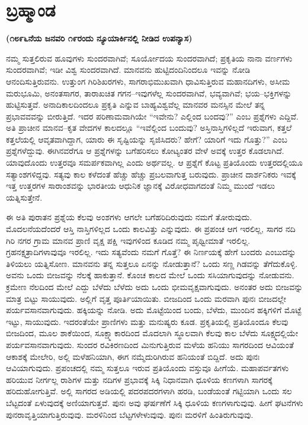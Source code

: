 \chapter{ಬ್ರಹ್ಮಾಂಡ}%

\centerline{\textbf{(೧೮೯೬ನೆಯ ಜನವರಿ ೧೯ರಂದು ನ್ಯೂಯಾರ್ಕಿನಲ್ಲಿ ನೀಡಿದ ಉಪನ್ಯಾಸ)}}

ನಮ್ಮ ಸುತ್ತಲಿರುವ ಹೂವುಗಳು ಸುಂದರವಾಗಿವೆ; ಸೂರ್ಯೋದಯ ಸುಂದರವಾಗಿದೆ; ಪ್ರಕೃತಿಯ ನಾನಾ ವರ್ಣಗಳು ಸುಂದರವಾಗಿವೆ; ಇಡೀ ವಿಶ್ವ ಸುಂದರವಾಗಿದೆ. ಮಾನವನು ಹುಟ್ಟಿದಂದಿನಿಂದಲೂ ಇವನ್ನು ನೋಡಿ ಆನಂದಿಸುತ್ತಿರುವನು. ಉತ್ತುಂಗ ಗಿರಿಶಿಖರಗಳು, ಸಾಗರಾಭಿಮುಖವಾಗಿ ಧಾವಿಸುತ್ತಿರುವ ಮಹಾನದಿಗಳು, ಅಸೀಮ ಮರುಭೂಮಿ, ಅನಂತಸಾಗರ, ತಾರಾಖಚಿತ ಗಗನ–ಇವುಗಳೆಲ್ಲ ಸುಂದರವಾಗಿವೆ, ಭವ್ಯವಾಗಿವೆ; ಭಯ–ಭಕ್ತಿಗಳನ್ನು ಹುಟ್ಟಿಸುತ್ತವೆ. ಅನಾದಿಕಾಲದಿಂದಲೂ ಪ್ರಕೃತಿ ಎನ್ನುವ ಬಾಹ್ಯವಿಶ್ವವೆಲ್ಲ ಮಾನವರ ಮನಸ್ಸಿನ ಮೇಲೆ ತನ್ನ ಪ್ರಭಾವವವನ್ನು ಬೀರುತ್ತಿದೆ. ಇದರ ಪರಿಣಾಮವಾಗಿಯೇ “ಇವೇನು? ಎಲ್ಲಿಂದ ಬಂದವು?” ಎಂಬ ಪ್ರಶ್ನೆಗಳು ಎದ್ದಿವೆ. ಅತಿ ಪ್ರಾಚೀನ ಮಾನವ–ಕೃತ ವೇದಗಳ ಕಾಲದಲ್ಲೂ “ಇವೆಲ್ಲಿಂದ ಬಂದುವು? ಅಸ್ತಿನಾಸ್ತಿಗಳಿಲ್ಲದೆ ಇರುವಾಗ, ಕತ್ತಲೆ ಕತ್ತಲೆಯಲ್ಲಿ ಆವೃತವಾಗಿದ್ದಾಗ, ಯಾರು ಈ ಸೃಷ್ಟಿಯನ್ನು ಸೃಜಿಸಿದರು? ಹೇಗೆ? ಯಾರಿಗೆ ಇದು ಗೊತ್ತು?” ಎಂಬ ಪ್ರಶ್ನೆಗಳೆದ್ದುವು. ಈಗಿನವರೆಗೂ ಆ ಪ್ರಶ್ನೆಗಳನ್ನು ಬಗೆಹರಿಸಲು ಕೋಟ್ಯಂತರ ವೇಳೆ ಅವಕ್ಕೆ ಉತ್ತರ ಕೊಡಲಾಗಿದೆ. ಯಾವುದೊಂದು ಉತ್ತರವೂ ಸಮರ್ಪಕವಾಗಿಲ್ಲ ಎಂದು ಅರ್ಥವಲ್ಲ. ಆ ಪ್ರಶ್ನೆಗೆ ಕೊಟ್ಟ ಪ್ರತಿಯೊಂದು ಉತ್ತರದಲ್ಲಿಯೂ ಸತ್ಯಾಂಶಗಳಿದ್ದವು. ಸತ್ಯವು ಕಾಲ ಕಳೆದಂತೆ ಹೆಚ್ಚು ಹೆಚ್ಚು ಪ್ರಬಲವಾಗುತ್ತ ಬರುವುದು. ಪ್ರಾಚೀನ ದಾರ್ಶನಿಕರು ಇವಕ್ಕೆ ಇತ್ತ ಉತ್ತರಗಳ ಸಾರಾಂಶವನ್ನು ಭಾರತೀಯ ಆಧುನಿಕ ಜ್ಞಾನಕ್ಕೆ ವಿರೋಧವಾಗದಂತೆ ನಿಮ್ಮ ಮುಂದೆ ಇಡಲು ಯತ್ನಿಸುತ್ತೇನೆ.

ಈ ಅತಿ ಪುರಾತನ ಪ್ರಶ್ನೆಯ ಕೆಲವು ಅಂಶಗಳು ಆಗಲೇ ಬಗೆಹರಿದಿರುವುದು ನಮಗೆ ತೋರುವುದು. ಮೊದಲನೆಯದೆಂದರೆ ಆಸ್ತಿ ನಾಸ್ತಿಗಳಿಲ್ಲದ ಒಂದು ಕಾಲವಿತ್ತು ಎನ್ನುವುದು. ಈ ಪ್ರಪಂಚ ಆಗ ಇರಲಿಲ್ಲ, ಸಾಗರ ನದಿ ಗಿರಿ ನಗರ ಗ್ರಾಮ ಮಾನವ ಪ್ರಾಣಿ ವೃಕ್ಷ ಪಕ್ಷಿ ಇವುಗಳಿಂದ ಕೂಡಿದ ನಮ್ಮ ಪೃಥ್ವೀಮಾತೆ ಇರಲಿಲ್ಲ. ಗ್ರಹನಕ್ಷತ್ರಾದಿಗಳಾವುವೂ ಇರಲಿಲ್ಲ. ಇದು ಸತ್ಯವೆಂದು ನಮಗೆ ಗೊತ್ತೆ? ಈ ನಿರ್ಣಯಕ್ಕೆ ಹೇಗೆ ಬಂದರು ಎಂಬುದನ್ನು ತಿಳಿಯಲು ಯತ್ನಿಸೋಣ. ಮಾನವನು ತನ್ನ ಸುತ್ತಲೂ ಏನನ್ನು ನೋಡುತ್ತಾನೆ? ಒಂದು ಸಣ್ಣ ಗಿಡವನ್ನು ತೆಗೆದುಕೊಳ್ಳಿ. ಅವನು ಒಂದು ಬೀಜವನ್ನು ನೆಲಕ್ಕೆ ಹಾಕುತ್ತಾನೆ. ಕೊಂಚ ಕಾಲದ ಮೇಲೆ ಒಂದು ಸಸಿಯಾಗುವುದನ್ನು ನೋಡುವನು. ಕ್ರಮೇಣ ನೆಲದಿಂದ ಮೇಲೆ ಎದ್ದು ಬೆಳೆದು ಬೆಳೆದು ಅದು ಒಂದು ಭೀಮವೃಕ್ಷವಾಗುವುದು. ಅನಂತರ ಅದು ಬೀಜವನ್ನು ಮಾತ್ರ ಬಿಟ್ಟು ಸಾಯುವುದು. ಅಲ್ಲಿಗೆ ವೃತ್ತ ಪೂರ್ತಿಯಾಯಿತು. ಬೀಜದಿಂದ ಒಂದು ಮರವಾಗಿ ಪುನಃ ಬೀಜದಲ್ಲೇ ಪರ್ಯವಸಾನವಾಗುವುದು. ಹಕ್ಕಿಯನ್ನು ನೋಡಿ. ಅದು ಮೊಟ್ಟೆಯಿಂದ ಬಂದು, ಬೆಳೆದು, ಮುಂದಿನ ಹಕ್ಕಿಗಳಿಗೆ ಮೊಟ್ಟೆ ಇಟ್ಟು, ಸಾಯುವುದು. ಇದರಂತೆಯೇ ಪ್ರಾಣಿಗಳು ಮತ್ತು ಮನುಷ್ಯರು ಕೂಡ. ಪ್ರಕೃತಿಯಲ್ಲಿ ಪ್ರತಿಯೊಂದೂ ಕೆಲವು ಬೀಜದಿಂದ, ಮೂಲ ಶಾಕೆಯಿಂದ, ಸೂಕ್ಷ್ಮಾಕಾರದಿಂದ ಮೊದಲಾಗಿ ಸ್ಥೂಲವಾಗಿ ಕೆಲವು ಕಾಲ ಬೆಳೆದು ಸೂಕ್ಷ್ಮದಲ್ಲಿಯೇ ಪರ್ಯವಸಾನವಾಗುವುದು. ಸುಂದರ ರವಿಕಿರಣದಿಂದ ಮಿನುಗುತ್ತಿರುವ ಮಳೆಯ ಹನಿಯು ಸಾಗರದಿಂದ ಆವಿಯಂತೆ ಆಕಾಶಕ್ಕೆ ಮೇಲೇರಿ, ಅಲ್ಲಿ ಮಳೆಹನಿಯಾಗಿ, ಈಗ ನಮ್ಮೆದುರಿಗಿರುವ ಹನಿಯಂತೆ ಬಿದ್ದಿದೆ. ಅದು ಪುನಃ ಆವಿಯಾಗುವುದು. ಪ್ರಪಂಚದಲ್ಲಿ ನಮ್ಮ ಸುತ್ತಲೂ ಇರುವ ಪ್ರತಿಯೊಂದು ವಸ್ತುವೂ ಹೀಗೆಯೆ. ಮಹಾಪರ್ವತಗಳು ಹರಿಯುವ ನೀರ್ಗಲ್ಲ ರಾಶಿಗಳ ಮತ್ತು ನದಿಗಳ ಪ್ರಭಾವಕ್ಕೆ ಸಿಕ್ಕಿ ನಿಧಾನವಾಗಿ ಧೂಳಿಯ ಕಣಗಳಾಗಿ ಸಾಗರಕ್ಕೆ ಹರಿದುಹೋಗುತ್ತಿವೆ. ಅಲ್ಲಿ ಸಾಗರದ ಅಡಿಯಲ್ಲಿ ಪದರಪದರಗಳಾಗಿ ಹರಡಿ, ಬಂಡೆಯಂತೆ ಗಟ್ಟಿಯಾಗಿ ಒಂದು ಸಲ ಬೆಟ್ಟದಂತೆ ಏಳುವುದಕ್ಕೆ ಅಣಿಯಾಗುತ್ತವೆ. ಪುನಃ ಅವು ಘರ್ಷಣೆಗೆ ಸಿಕ್ಕಿ ಧೂಳಿಯ ಕಣಗಳಾಗುವುವು. ಹೀಗೆ ಘಟನೆಗಳು ಪುನರಾವೃತ್ತಿಯಾಗುತ್ತಿರುವುವು. ಮರಳಿನಿಂದ ಬೆಟ್ಟಗಳೇಳುವುವು. ಪುನಃ ಮರಳಿಗೆ ಹಿಂತಿರುಗುವುವು.

